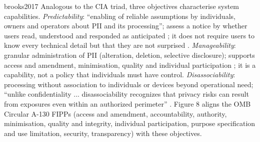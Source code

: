\begin{papercard}{brooks2017}
 Analogous to the CIA triad, three objectives characterise system capabilities. \emph{Predictability}: ``enabling of reliable assumptions by individuals, owners and operators about PII and its processing''; assess a notice by whether users read, understood and responded as anticipated ; it does not require users to know every technical detail but that they are not surprised . \emph{Manageability}: granular administration of PII (alteration, deletion, selective disclosure); supports access and amendment, minimisation, quality and individual participation ; it is a capability, not a policy that individuals must have control. \emph{Disassociability}: processing without association to individuals or devices beyond operational need; ``unlike confidentiality ... disassociability recognizes that privacy risks can result from exposures even within an authorized perimeter'' . Figure 8 aligns the OMB Circular A-130 FIPPs (access and amendment, accountability, authority, minimisation, quality and integrity, individual participation, purpose specification and use limitation, security, transparency) with these objectives.


\end{papercard}
